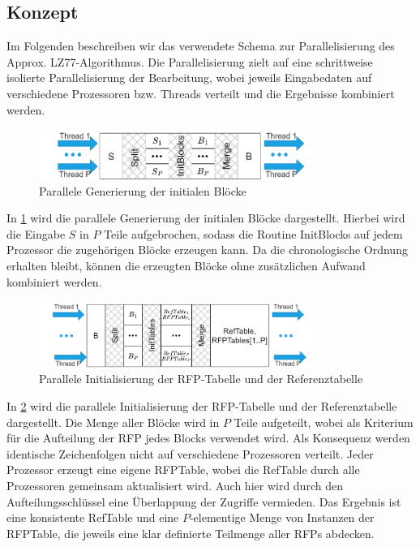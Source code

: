 \subsection{Konzept}
Im Folgenden beschreiben wir das verwendete Schema zur Parallelisierung des Approx. LZ77-Algorithmus. Die Parallelisierung zielt auf eine schrittweise isolierte Parallelisierung der Bearbeitung, wobei
jeweils Eingabedaten auf verschiedene Prozessoren bzw. Threads verteilt und die Ergebnisse kombiniert werden.
\begin{figure}[h]
    \centering
    \includegraphics[width=0.8\textwidth]{Images/parallel_initnodes.png}
    \caption{Parallele Generierung der initialen Blöcke}
    \label{fig:parinitnodes}
\end{figure}
In \ref{fig:parinitnodes} wird die parallele Generierung der initialen Blöcke dargestellt. Hierbei wird die Eingabe $S$ in $P$ Teile aufgebrochen, sodass die Routine InitBlocks auf jedem Prozessor
die zugehörigen Blöcke erzeugen kann. Da die chronologische Ordnung erhalten bleibt, können die erzeugten Blöcke ohne zusätzlichen Aufwand kombiniert werden.

\begin{figure}[h]
    \centering
    \includegraphics[width=0.8\textwidth]{Images/parallel_inittables.png}
    \caption{Parallele Initialisierung der RFP-Tabelle und der Referenztabelle}
    \label{fig:parinittables}
\end{figure}
In \ref{fig:parinittables} wird die parallele Initialisierung der RFP-Tabelle und der Referenztabelle dargestellt. Die Menge aller Blöcke wird in $P$ Teile aufgeteilt, wobei als Kriterium für die
Aufteilung der RFP jedes Blocks verwendet wird. Als Konsequenz werden identische Zeichenfolgen nicht auf verschiedene Prozessoren verteilt. Jeder Prozessor erzeugt eine eigene RFPTable, wobei
die RefTable durch alle Prozessoren gemeinsam aktualisiert wird. Auch hier wird durch den Aufteilungsschlüssel eine Überlappung der Zugriffe vermieden. Das Ergebnis ist eine konsistente
RefTable und eine $P$-elementige Menge von Instanzen der RFPTable, die jeweils eine klar definierte Teilmenge aller RFPs abdecken.


